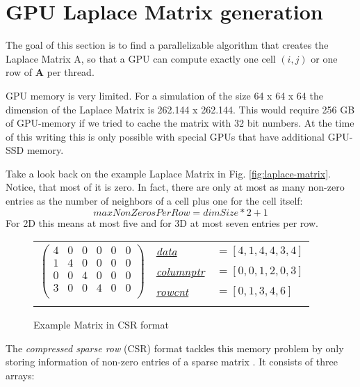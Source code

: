 \section{GPU Laplace Matrix generation}
The goal of this section is to find a parallelizable algorithm that creates the Laplace Matrix A, so that a GPU can compute exactly one cell $(i,j)$ or one row of \textbf{A} per thread.
\par GPU memory is very limited. For a simulation of the size 64 x 64 x 64 the dimension of the Laplace Matrix is 262.144 x 262.144. This would require 256 GB of GPU-memory if we tried to cache the matrix with 32 bit numbers. At the time of this writing this is only possible with special GPUs that have additional GPU-SSD memory.
\par Take a look back on the example Laplace Matrix in Fig. \ref{fig:laplace-matrix}. Notice, that most of it is zero. In fact, there are only at most as many non-zero entries as the number of neighbors of a cell plus one for the cell itself:
\begin{equation}
	maxNonZerosPerRow = dimSize * 2 + 1
\end{equation}
For 2D this means at most five and for 3D at most seven entries per row.
\newpage
\begin{figure*}
	\centering
	\begin{tabular}{lll}
	\multirow{3}{*}{$\left( {\begin{array}{cccccc}
   4 & 0 & 0 & 0 & 0 & 0  \\
   1 & 4 & 0 & 0 & 0 & 0  \\
   0 & 0 & 4 & 0 & 0 & 0  \\
   3 & 0 & 0 & 4 & 0 & 0  \\
  \end{array} } \right)$}
	& \hyperref[csr-data]{\textit{data}} & $=[4,1,4,4,3,4]$  \\
	& \hyperref[csr-columnptr]{\textit{columnptr}} & $=[0,0,1,2,0,3]$ \\
	& \hyperref[csr-rowcnt]{\textit{rowcnt}} & $=[0,1,3,4,6]$ \\
	& & 
	\end{tabular}
\caption{Example Matrix in CSR format}\label{fig:csr-matrix}
\end{figure*}
\par The \textit{compressed sparse row} (CSR) format tackles this memory problem by only storing information of non-zero entries of a sparse matrix \parencite{tinney1967direct}. It consists of three arrays:\\\\
